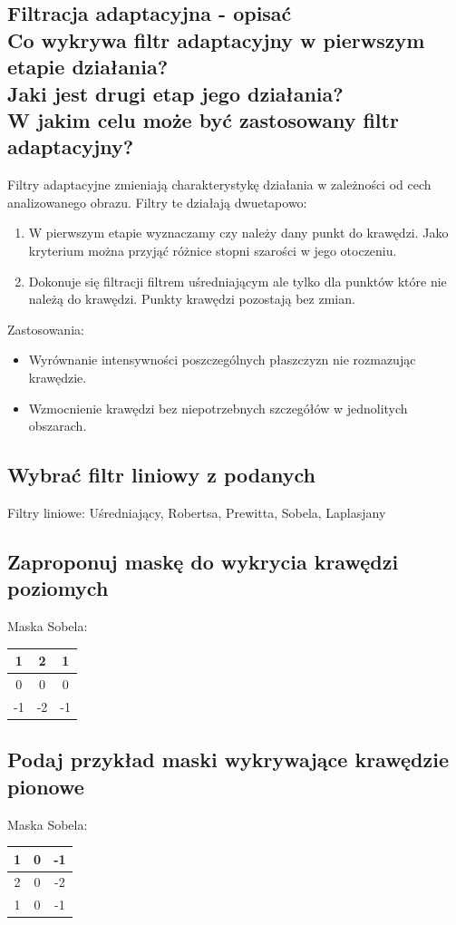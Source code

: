 \documentclass[a4paper, 12pt, titlepage]{article}
\begin{document}
\subsection{Filtracja adaptacyjna - opisać \\ Co wykrywa filtr adaptacyjny w pierwszym etapie działania? \\ Jaki jest drugi etap jego działania? \\ W jakim celu może być zastosowany filtr adaptacyjny?}
Filtry adaptacyjne zmieniają charakterystykę działania w zależności od cech analizowanego obrazu. Filtry te działają dwuetapowo:
\begin{enumerate}[noitemsep]
	\item W pierwszym etapie wyznaczamy czy należy dany punkt do krawędzi. Jako kryterium można przyjąć różnice stopni szarości w jego otoczeniu.
	\item Dokonuje się filtracji filtrem uśredniającym ale tylko dla punktów które nie należą do krawędzi. Punkty krawędzi pozostają bez zmian.
\end{enumerate}
Zastosowania:
\begin{itemize}[noitemsep]
	\item Wyrównanie intensywności poszczególnych płaszczyzn nie rozmazując krawędzie.
	\item Wzmocnienie krawędzi bez niepotrzebnych szczegółów w jednolitych obszarach.
\end{itemize}

\subsection{Wybrać filtr liniowy z podanych}
Filtry liniowe: Uśredniający, Robertsa, Prewitta, Sobela, Laplasjany

\subsection{Zaproponuj maskę do wykrycia krawędzi poziomych}
Maska Sobela:
\begin{tabular}{|c|c|c|}
	\hline
	1 & 2 & 1 \\ \hline
	0 & 0 & 0 \\ \hline
	-1 & -2 & -1 \\ \hline
\end{tabular}
\subsection{Podaj przykład maski wykrywające krawędzie pionowe}
Maska Sobela:
\begin{tabular}{|c|c|c|}
	\hline
	1 & 0 & -1 \\ \hline
	2 & 0 & -2 \\ \hline
	1 & 0 & -1 \\ \hline
\end{tabular}
\end{document}
